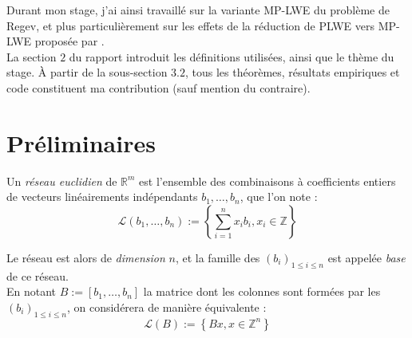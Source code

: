 \documentclass[11pt,a4paper]{article}
\begin{document}
Durant mon stage, j'ai ainsi travaillé sur la variante MP-LWE du problème de Regev, et plus particulièrement sur les effets de la réduction de PLWE vers MP-LWE proposée par \cite{mplwe}. \\

La section $2$ du rapport introduit les définitions utilisées, ainsi que le thème du stage. À partir de la sous-section $3.2$, tous les théorèmes, résultats empiriques et code constituent ma contribution (sauf mention du contraire).

\section{Préliminaires}
\begin{defin} 
Un \textit{réseau euclidien} de $\mathbb{R}^m$ est l'ensemble des combinaisons à coefficients entiers de vecteurs linéairements indépendants $b_1, \dots, b_n$, que l'on note :
\[\mathcal{L}(b_1,\dots,b_n) := \left\{ \sum_{i=1}^n x_ib_i, x_i \in \mathbb{Z} \right\} \]

Le réseau est alors de \textit{dimension} $n$, et la famille des $(b_i)_{1\leq i \leq n}$ est appelée \textit{base} de ce réseau. \\

En notant $B:=[b_1,\dots,b_n]$ la matrice dont les colonnes sont formées par les $(b_i)_{1\leq i \leq n}$, on considérera de manière équivalente : \[\mathcal{L}(B) := \left\{ Bx, x \in \mathbb{Z}^n \right\} \]
\end{defin}
\end{document}
